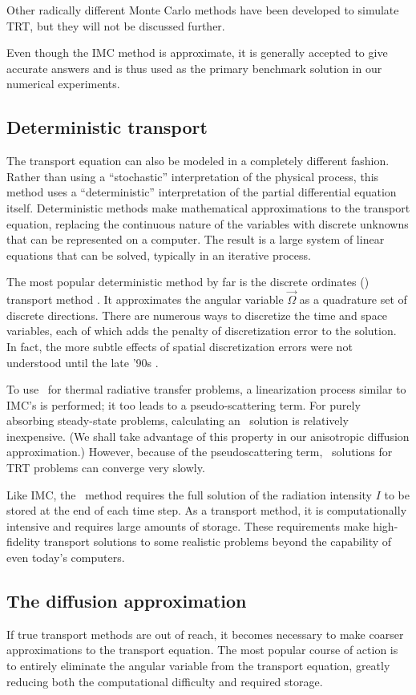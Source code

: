 Other radically different Monte Carlo methods \cite{Bro1989,NKa1991,Cha2007a}
have been developed to simulate TRT, but they will not be discussed further.

Even though the IMC method is approximate, it is generally accepted to give
accurate answers and is thus used as the primary benchmark solution in
our numerical experiments. 

\subsection{Deterministic transport}
The transport equation can also be modeled in a completely different fashion.
Rather than using a ``stochastic'' interpretation of the physical process,
this method
uses a ``deterministic'' interpretation of the partial differential equation
itself. Deterministic methods make mathematical approximations to the transport
equation, replacing the continuous nature of the variables with discrete
unknowns that can be represented on a computer. The result is a large system of
linear equations that can be solved, typically in an iterative process.

The most popular deterministic method by far is the discrete ordinates (\SN)
transport method \cite{Lar2010}. It approximates the angular variable
$\vec{\Omega}$ as a quadrature set of discrete directions. There are numerous
ways to discretize the time and space variables, each of which adds the penalty
of discretization error to the solution. In fact, the more subtle effects of
spatial discretization errors were not understood until the late '90s
\cite{Ada1998,Ada2001}.

To use \SN\ for thermal radiative transfer problems, a linearization process
similar to IMC's is performed; it too leads to a pseudo-scattering term.
For purely absorbing steady-state problems, calculating an \SN\ solution is
relatively inexpensive. (We shall take advantage of this property in our
anisotropic diffusion approximation.) However, because of the pseudoscattering
term, \SN\ solutions for TRT problems can converge very slowly.

Like IMC, the \SN\ method requires the full solution of the radiation intensity
$I$ to be stored at the end of each time step. As a transport method, it is
computationally intensive and requires large amounts of storage. These
requirements make high-fidelity transport solutions to some realistic problems
beyond the capability of even today's computers.

\subsection{The diffusion approximation}
If true transport methods are out of reach, it becomes necessary to make
coarser approximations to the transport equation.
The most popular course of action is to entirely eliminate the angular variable
from the transport equation, greatly reducing both the computational difficulty
and required storage.

